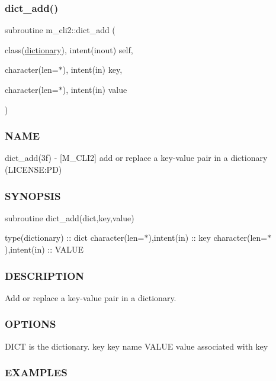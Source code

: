 \subsubsection{\texorpdfstring{dict\+\_\+add()}{dict\_add()}}
{\footnotesize\ttfamily subroutine m\+\_\+cli2\+::dict\+\_\+add (\begin{DoxyParamCaption}\item[{class(\mbox{\hyperlink{structm__cli2_1_1dictionary}{dictionary}}), intent(inout)}]{self,  }\item[{character(len=$\ast$), intent(in)}]{key,  }\item[{character(len=$\ast$), intent(in)}]{value }\end{DoxyParamCaption})\hspace{0.3cm}{\ttfamily [private]}}



\subsubsection*{N\+A\+ME}

dict\+\_\+add(3f) -\/ \mbox{[}M\+\_\+\+C\+L\+I2\mbox{]} add or replace a key-\/value pair in a dictionary (L\+I\+C\+E\+N\+SE\+:PD) 

\subsubsection*{S\+Y\+N\+O\+P\+S\+IS}

subroutine dict\+\_\+add(dict,key,value)

type(dictionary) \+:\+: dict character(len=$\ast$),intent(in) \+:\+: key character(len=$\ast$),intent(in) \+:\+: V\+A\+L\+UE

\subsubsection*{D\+E\+S\+C\+R\+I\+P\+T\+I\+ON}

Add or replace a key-\/value pair in a dictionary.

\subsubsection*{O\+P\+T\+I\+O\+NS}

D\+I\+CT is the dictionary. key key name V\+A\+L\+UE value associated with key

\subsubsection*{E\+X\+A\+M\+P\+L\+ES}


